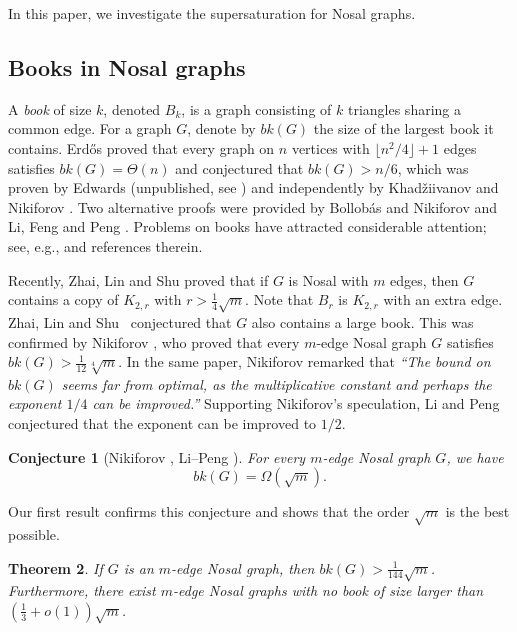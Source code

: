 \documentclass[11pt,a4paper]{article}
\newtheorem{theorem}{Theorem}[section]
\newtheorem{conj}[theorem]{Conjecture}
\theoremstyle{definition}
\theoremstyle{remark}
\begin{document}
In this paper, we investigate the supersaturation for Nosal graphs. 



 

 

\subsection{Books in Nosal graphs}
A \emph{book} of size $k$, denoted $B_k$, is a graph consisting of $k$ triangles sharing a common edge. For a graph $G$, denote by $bk(G)$ the size of the largest book it contains.
Erd\H{o}s \cite{Erd1962a} proved that every graph on $n$ vertices with $\lfloor n^2/4\rfloor +1$ edges satisfies $bk(G) = \Theta(n)$ and conjectured that $bk(G)> n / 6$, which was proven by Edwards (unpublished, see \cite[Lemma 4]{EFR1992}) 
and independently 
by Khad\v{z}iivanov and Nikiforov  \cite{KN1979}. 
Two alternative proofs were provided by 
Bollob\'{a}s and Nikiforov \cite{BN2005} and Li, Feng and Peng \cite[Sec. 4.3]{LFP2024-triangular}.  Problems on books have attracted considerable attention; see, e.g., \cite{FL2012,CFS2020-Siam,CFW2022,ZL2022jgt} and references therein. 



Recently, Zhai, Lin and Shu \cite{ZLS2021} proved that if $G$ is Nosal with $m$ edges, then $G$ contains a copy of $K_{2,r}$ with $r >\frac{1}{4} \sqrt{m}$. Note that $B_{r}$ is $K_{2, r}$ with an extra edge. Zhai, Lin and Shu~\cite{ZLS2021} conjectured that $G$ also contains a large book. This was confirmed by Nikiforov \cite{Niki2021}, who proved that every $m$-edge Nosal graph $G$ satisfies $bk(G)>\frac{1}{12}\sqrt[4]{m}$. In the same paper, Nikiforov remarked that \emph{``The bound on $bk(G)$ seems far from optimal, as the multiplicative
constant and perhaps the exponent $1/4$ can be improved.''} Supporting Nikiforov's speculation, Li and Peng \cite{LP2022oddcycle} conjectured that the exponent can be improved to $1/2$. 

\begin{conj}[Nikiforov \cite{Niki2021}, Li--Peng \cite{LP2022oddcycle}] 
\label{conj-ZLS}
For every $m$-edge Nosal graph $G$, we have $$bk(G)=\Omega(\sqrt{m}).$$
\end{conj}

Our first result confirms this conjecture and shows that the order $\sqrt{m}$ is the best possible. 

\begin{theorem} \label{thm-booksize}
If $G$ is an $m$-edge Nosal graph, then $bk (G) > \frac{1}{144} \sqrt{m}$.
Furthermore, there exist $m$-edge Nosal graphs with no book of size larger than $(\frac{1}{3}+o(1))\sqrt{m}$.
\end{theorem}
\end{document}
